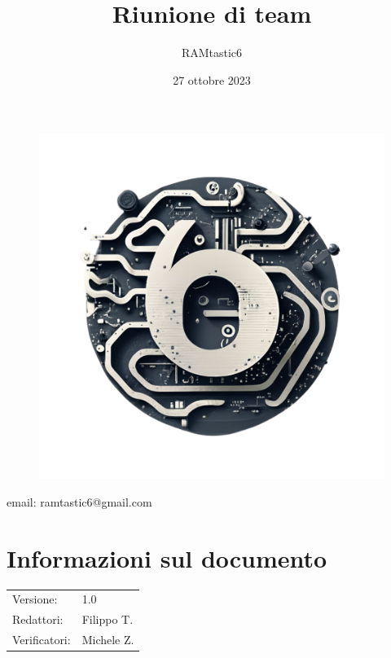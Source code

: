 \documentclass[12pt, oneside]{article}
\author{RAMtastic6}
\begin{document}
\thispagestyle{empty}
\title{Riunione di team}
\date{27 ottobre 2023} %

\maketitle
\begin{figure}[h]
	\centering
	\includegraphics[scale=0.3]{logo.png}
	\label{}
\end{figure}
\begin{center}
    email: ramtastic6@gmail.com
\end{center}

\section*{Informazioni sul documento}
\begin{tabular}{ll}
Versione: & 1.0 \\
Redattori: & Filippo T. \\
Verificatori: & Michele Z. \\
\end{tabular}
\newpage

\tableofcontents
\newpage

\end{document}
